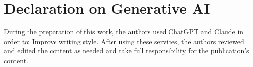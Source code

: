 \documentclass[
]{ceurart}
\begin{document}
\section*{Declaration on Generative AI}

During the preparation of this work, the authors used ChatGPT and Claude in order to: Improve writing style. 
After using these services, the authors reviewed and edited the content as needed and take full responsibility for the publication's content. 




\appendix
\end{document}
